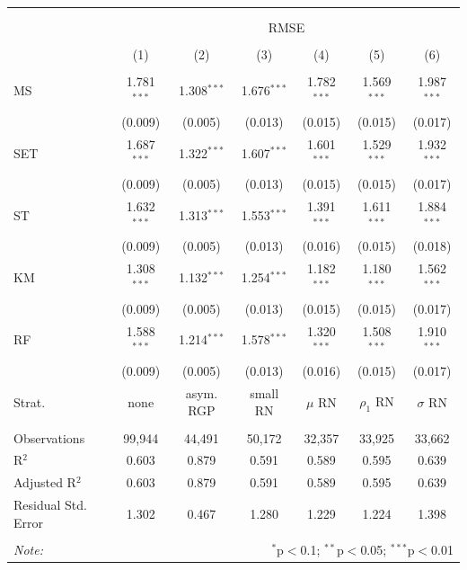 \begin{tabular}{@{\extracolsep{5pt}}lcccccc} 
\\[-1.8ex]\hline 
\hline \\[-1.8ex] 
\\[-1.8ex] & \multicolumn{6}{c}{RMSE} \\ 
\\[-1.8ex] & (1) & (2) & (3) & (4) & (5) & (6)\\ 
\hline \\[-1.8ex] 
 MS & 1.781$^{***}$ & 1.308$^{***}$ & 1.676$^{***}$ & 1.782$^{***}$ & 1.569$^{***}$ & 1.987$^{***}$ \\ 
  & (0.009) & (0.005) & (0.013) & (0.015) & (0.015) & (0.017) \\ 
  SET & 1.687$^{***}$ & 1.322$^{***}$ & 1.607$^{***}$ & 1.601$^{***}$ & 1.529$^{***}$ & 1.932$^{***}$ \\ 
  & (0.009) & (0.005) & (0.013) & (0.015) & (0.015) & (0.017) \\ 
  ST & 1.632$^{***}$ & 1.313$^{***}$ & 1.553$^{***}$ & 1.391$^{***}$ & 1.611$^{***}$ & 1.884$^{***}$ \\ 
  & (0.009) & (0.005) & (0.013) & (0.016) & (0.015) & (0.018) \\ 
  KM & 1.308$^{***}$ & 1.132$^{***}$ & 1.254$^{***}$ & 1.182$^{***}$ & 1.180$^{***}$ & 1.562$^{***}$ \\ 
  & (0.009) & (0.005) & (0.013) & (0.015) & (0.015) & (0.017) \\ 
  RF & 1.588$^{***}$ & 1.214$^{***}$ & 1.578$^{***}$ & 1.320$^{***}$ & 1.508$^{***}$ & 1.910$^{***}$ \\ 
  & (0.009) & (0.005) & (0.013) & (0.016) & (0.015) & (0.017) \\ 
  Strat. & none & asym. RGP & small RN & $\mu$ RN & $\rho_1$ RN & $\sigma$ RN \\
 \hline \\[-1.8ex] 
Observations & 99,944 & 44,491 & 50,172 & 32,357 & 33,925 & 33,662 \\ 
R$^{2}$ & 0.603 & 0.879 & 0.591 & 0.589 & 0.595 & 0.639 \\ 
Adjusted R$^{2}$ & 0.603 & 0.879 & 0.591 & 0.589 & 0.595 & 0.639 \\ 
Residual Std. Error & 1.302 & 0.467 & 1.280 & 1.229 & 1.224 & 1.398 \\ 
\hline 
\hline \\[-1.8ex] 
\textit{Note:}  & \multicolumn{6}{r}{$^{*}$p$<$0.1; $^{**}$p$<$0.05; $^{***}$p$<$0.01} \\ 
\end{tabular} 
